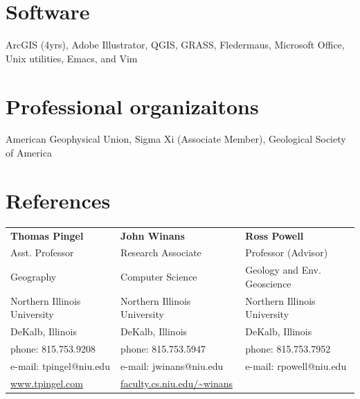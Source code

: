 \documentclass{cv_TOH}
\begin{document}
\section{Software}
ArcGIS (4yrs), Adobe Illustrator, QGIS, GRASS, Fledermaus, Microsoft Office, Unix utilities, Emacs, and Vim

\section{Professional organizaitons}
American Geophysical Union, Sigma Xi (Associate Member), Geological Society of America

\section{References}
\begin{tabular}{@{}p{6cm}p{6cm}p{6cm}}
 \textbf{Thomas Pingel}            & \textbf{John Winans}              &   \textbf{Ross Powell}           \\
 Asst. Professor                   &  Research Associate               &   Professor (Advisor)            \\ 
 Geography                         &  Computer Science                 &   Geology and Env. Geoscience    \\
 Northern Illinois University      &  Northern Illinois University     &   Northern Illinois University   \\ 
 DeKalb, Illinois                  &  DeKalb, Illinois                 &   DeKalb, Illinois               \\
 phone: 815.753.9208               &  phone: 815.753.5947              &   phone: 815.753.7952            \\
 e-mail: tpingel@niu.edu           &  e-mail: jwinans@niu.edu          &   e-mail: rpowell@niu.edu        \\
 \url{www.tpingel.com}             &  \url{faculty.cs.niu.edu/~winans} &                                  \\     
\end{tabular}
\end{document}
